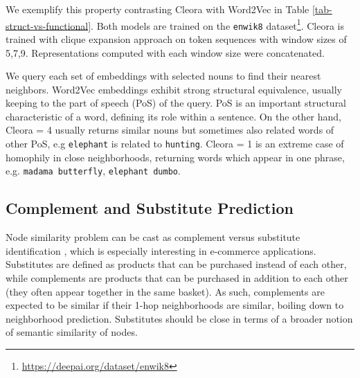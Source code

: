 \documentclass{IEEEtran}
\begin{document}
We exemplify this property contrasting Cleora with Word2Vec \cite{Word2Vec} in Table \ref{tab-struct-vs-functional}. Both models are trained on the \texttt{enwik8} dataset\footnote{\url{https://deepai.org/dataset/enwik8}}. Cleora is trained with clique expansion approach on token sequences with window sizes of 5,7,9. Representations computed with each window size were concatenated. 

We query each set of embeddings with selected nouns to find their nearest neighbors. Word2Vec embeddings exhibit strong structural equivalence, usually keeping to the part of speech (PoS) of the query. PoS is an important structural characteristic of a word, defining its role within a sentence. On the other hand, Cleora  = 4 usually returns similar nouns but sometimes also related words of other PoS, e.g \texttt{elephant} is related to \texttt{hunting}. Cleora  = 1 is an extreme case of homophily in close neighborhoods, returning words which appear in one phrase, e.g. \texttt{madama butterfly}, \texttt{elephant dumbo}.

       




\subsection{Complement and Substitute Prediction}
Node similarity problem can be cast as complement versus substitute identification \cite{mcauley2015inferring}, which is especially interesting in e-commerce applications. Substitutes are defined as products that can be purchased instead of each other, while complements are products that can be purchased in addition to each other (they often appear together in the same basket). As such, complements are expected to be similar if their 1-hop neighborhoods are similar, boiling down to neighborhood prediction. Substitutes should be close in terms of a broader notion of semantic similarity of nodes.
\end{document}
